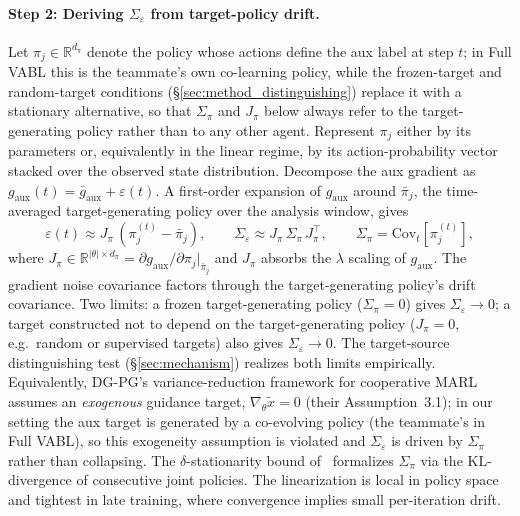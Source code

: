 \documentclass{article}
\theoremstyle{plain}
\theoremstyle{definition}
\theoremstyle{remark}
\begin{document}
\paragraph{Step 2: Deriving $\Sigma_\varepsilon$ from target-policy drift.}
Let $\pi_j \in \mathbb{R}^{d_\pi}$ denote the policy whose actions
define the aux label at step $t$; in Full VABL this is the teammate's
own co-learning policy, while the frozen-target and random-target
conditions (\S\ref{sec:method_distinguishing}) replace it with a
stationary alternative, so that $\Sigma_\pi$ and $J_\pi$ below
always refer to the target-generating policy rather than to any
other agent. Represent $\pi_j$ either by its parameters or,
equivalently in the linear regime, by its action-probability vector
stacked over the observed state distribution. Decompose the aux
gradient as $g_{\mathrm{aux}}(t) = \bar g_{\mathrm{aux}} +
\varepsilon(t)$. A first-order expansion of
$g_{\mathrm{aux}}$ around $\bar\pi_j$, the time-averaged
target-generating policy over the analysis window, gives
\begin{equation}
    \varepsilon(t) \approx J_\pi \,(\pi_j^{(t)} - \bar\pi_j),
    \qquad
    \Sigma_\varepsilon \approx J_\pi \,\Sigma_\pi\, J_\pi^\top,
    \qquad
    \Sigma_\pi = \mathrm{Cov}_t[\pi_j^{(t)}],
    \label{eq:drift_to_noise}
\end{equation}
where $J_\pi \in \mathbb{R}^{|\theta| \times d_\pi} = \partial
g_{\mathrm{aux}}/\partial \pi_j |_{\bar\pi_j}$ and $J_\pi$ absorbs
the $\lambda$ scaling of $g_{\mathrm{aux}}$. The gradient noise
covariance factors through the target-generating policy's drift
covariance. Two
limits: a frozen target-generating policy ($\Sigma_\pi = 0$) gives
$\Sigma_\varepsilon \to 0$; a target constructed not to depend on
the target-generating policy ($J_\pi = 0$, e.g.\ random or
supervised targets) also gives $\Sigma_\varepsilon \to 0$. The
target-source distinguishing test (\S\ref{sec:mechanism}) realizes
both limits empirically. Equivalently, DG-PG's variance-reduction
framework for cooperative MARL~\cite{yang2026dgpg} assumes an
\emph{exogenous} guidance target, $\nabla_\theta \tilde{x} = 0$
(their Assumption~3.1); in our setting the aux target is generated
by a co-evolving policy (the teammate's in Full VABL), so this
exogeneity assumption is violated and $\Sigma_\varepsilon$ is
driven by $\Sigma_\pi$ rather than collapsing. The $\delta$-stationarity bound
of~\cite{li2022trustregion} formalizes $\Sigma_\pi$ via the
KL-divergence of consecutive joint policies.
The linearization is local in policy space and tightest in late
training, where convergence implies small per-iteration drift.
\end{document}
